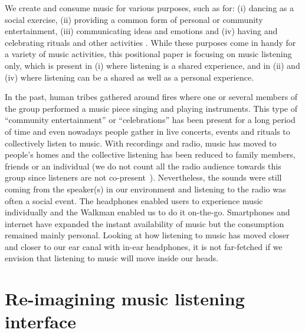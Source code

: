 \documentclass[manuscript,screen]{acmart}
\begin{document}
We create and consume music for various purposes, such as for: (i) dancing as a social exercise, (ii) providing a common form of personal or community entertainment, (iii) communicating ideas and emotions and (iv) having and celebrating rituals and other activities \cite{montagu2017music}. While these purposes come in handy for a variety of music activities, this positional paper is focusing on music listening only, which is present in (i) where listening is a shared experience, and in (ii) and (iv) where listening can be a shared as well as a personal experience. 

In the past, human tribes gathered around fires where one or several members of the group performed a music piece singing and playing instruments. This type of ``community entertainment'' or ``celebrations'' has been present for a long period of time and even nowadays people gather in live concerts, events and rituals to collectively listen to music. With recordings and radio, music has moved to people's homes and the collective listening has been reduced to family members, friends or an individual (we do not count all the radio audience towards this group since listeners are not co-present~\cite{bonini2014new}). Nevertheless, the sounds were still coming from the speaker(s) in our environment and listening to the radio was often a social event. The headphones enabled users to experience music individually and the Walkman enabled us to do it on-the-go. Smartphones and internet have expanded the instant availability of music but the consumption remained mainly personal. Looking at how listening to music has moved closer and closer to our ear canal with in-ear headphones, it is not far-fetched if we envision that listening to music will move inside our heads.

\section{Re-imagining music listening interface}

\end{document}
